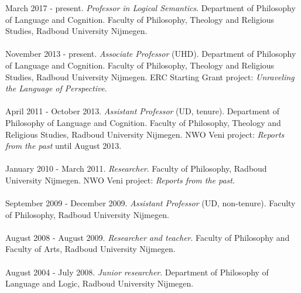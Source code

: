 \documentclass[a4paper,11pt]{article}
\begin{document}
March 2017 - present. \emph{Professor in Logical Semantics}.  Department of Philosophy of Language and Cognition. Faculty of Philosophy, Theology and Religious Studies, Radboud University Nijmegen.\\\\
November 2013 - present. \emph{Associate Professor} (UHD).  Department of Philosophy of Language and Cognition. Faculty of Philosophy, Theology and Religious Studies, Radboud University Nijmegen. ERC Starting Grant project: \emph{Unraveling the Language of Perspective}.\\\\
April 2011 - October 2013. \emph{Assistant Professor} (UD, tenure). Department of Philosophy of Language and Cognition. Faculty of Philosophy, Theology and Religious Studies, Radboud University Nijmegen.  NWO Veni project: \emph{Reports from the past} until August 2013.\\\\
January 2010 - March 2011.  \emph{Researcher}. Faculty of Philosophy, Radboud University Nijmegen.
NWO Veni project: \emph{Reports from the past}.\\\\
September 2009 - December 2009. \emph{Assistant Professor} (UD, non-tenure). Faculty of Philosophy, Radboud University Nijmegen.\\\\ 
August 2008 - August 2009. \emph{Researcher and teacher}. Faculty of Philosophy and Faculty of Arts, Radboud University Nijmegen.\\\\
August 2004 - July 2008. \emph{Junior researcher}. Department of
Philosophy of Language and Logic, Radboud University Nijmegen.\\\\
\end{document}
